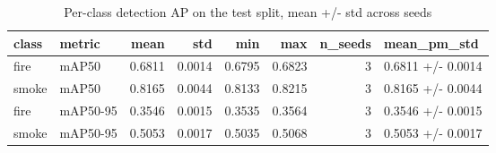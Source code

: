 \begin{table}
\caption{Per-class detection AP on the test split, mean +/- std across seeds}
\begin{tabular}{llrrrrrl}
\toprule
class & metric & mean & std & min & max & n\_seeds & mean\_pm\_std \\
\midrule
fire & mAP50 & 0.6811 & 0.0014 & 0.6795 & 0.6823 & 3 & 0.6811 +/- 0.0014 \\
smoke & mAP50 & 0.8165 & 0.0044 & 0.8133 & 0.8215 & 3 & 0.8165 +/- 0.0044 \\
fire & mAP50-95 & 0.3546 & 0.0015 & 0.3535 & 0.3564 & 3 & 0.3546 +/- 0.0015 \\
smoke & mAP50-95 & 0.5053 & 0.0017 & 0.5035 & 0.5068 & 3 & 0.5053 +/- 0.0017 \\
\bottomrule
\end{tabular}
\end{table}

